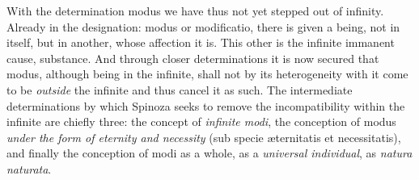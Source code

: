 \documentclass[12pt,a4paper,openany]{book}
\newcommand{\opage}[1]{\marginnote{\footnotesize\textit{[#1]}}}
\begin{document}
With the determination modus we have thus not yet stepped out of
infinity. Already in the designation: modus or modificatio, there is
given a being, not in itself, but in another, whose affection it is.
This other is the infinite immanent cause, substance. And through
closer
\opage{60}\setcounter{footnote}{0}determinations it is now secured that modus, although being in the
infinite, shall not by its heterogeneity with it come to be \emph{outside} the
infinite and thus cancel it as such. The intermediate determinations
by which Spinoza seeks to remove the incompatibility within the
infinite are chiefly three: the concept of \emph{infinite modi},
the conception of modus \emph{under the form of eternity and necessity} (sub
specie æternitatis et necessitatis), and finally the conception of modi
as a whole, as a \emph{universal individual}, as \emph{natura
naturata}.
\end{document}
